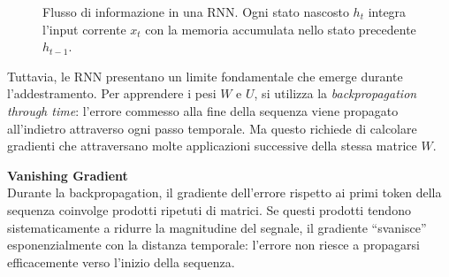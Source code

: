\begin{figure}[htbp]
\centering
{}
\caption{Flusso di informazione in una RNN. Ogni stato nascosto $h_t$ integra l'input corrente $x_t$ con la memoria accumulata nello stato precedente $h_{t-1}$.}
\label{fig:rnn_flow}
\end{figure}
Tuttavia, le RNN presentano un limite fondamentale che emerge durante l'addestramento. Per apprendere i pesi $W$ e $U$, si utilizza la \textit{backpropagation through time}: l'errore commesso alla fine della sequenza viene propagato all'indietro attraverso ogni passo temporale. Ma questo richiede di calcolare gradienti che attraversano molte applicazioni successive della stessa matrice $W$.
\begin{notebox}
\textbf{Vanishing Gradient}\\
Durante la backpropagation, il gradiente dell'errore rispetto ai primi token della sequenza coinvolge prodotti ripetuti di matrici. Se questi prodotti tendono sistematicamente a ridurre la magnitudine del segnale, il gradiente ``svanisce'' esponenzialmente con la distanza temporale: l'errore non riesce a propagarsi efficacemente verso l'inizio della sequenza.
\end{notebox}
